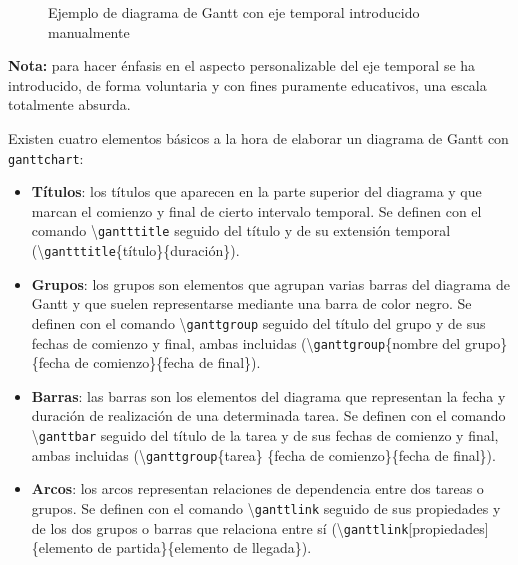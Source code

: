 \documentclass[a4paper, 11pt, spanish, twoside]{article}
\begin{document}
\begin{figure}[H]
\begin{ganttchart}

\end{ganttchart}
\caption{Ejemplo de diagrama de Gantt con eje temporal introducido manualmente}
\label{fig:ganttmanual}
\end{figure}

\textbf{Nota:} para hacer énfasis en el aspecto personalizable del eje temporal se ha introducido, de forma voluntaria y con fines puramente educativos, una escala totalmente absurda.

Existen cuatro elementos básicos a la hora de elaborar un diagrama de Gantt con \texttt{ganttchart}:

\vspace{-5pt}
\begin{itemize}
    \item \textbf{Títulos}: los títulos que aparecen en la parte superior del diagrama y que marcan el comienzo y final de cierto intervalo temporal. Se definen con el comando \textbackslash\texttt{gantttitle} seguido del título y de su extensión temporal (\textbackslash\texttt{gantttitle}\{título\}\{duración\}).
    \item \textbf{Grupos}: los grupos son elementos que agrupan varias barras del diagrama de Gantt y que suelen representarse mediante una barra de color negro. Se definen con el comando \textbackslash\texttt{ganttgroup} seguido del título del grupo y de sus fechas de comienzo y final, ambas incluidas (\textbackslash\texttt{ganttgroup}\{nombre del grupo\}\{fecha de comienzo\}\{fecha de final\}).
    \item \textbf{Barras}: las barras son los elementos del diagrama que representan la fecha y duración de realización de una determinada tarea. Se definen con el comando \textbackslash\texttt{ganttbar} seguido del título de la tarea y de sus fechas de comienzo y final, ambas incluidas (\textbackslash\texttt{ganttgroup}\{tarea\} \{fecha de comienzo\}\{fecha de final\}).
    \item \textbf{Arcos}: los arcos representan relaciones de dependencia entre dos tareas o grupos. Se definen con el comando \textbackslash\texttt{ganttlink} seguido de sus propiedades y de los dos grupos o barras que relaciona entre sí (\textbackslash\texttt{ganttlink}[propiedades]\{elemento de partida\}\{elemento de llegada\}).
\end{itemize}
\end{document}
